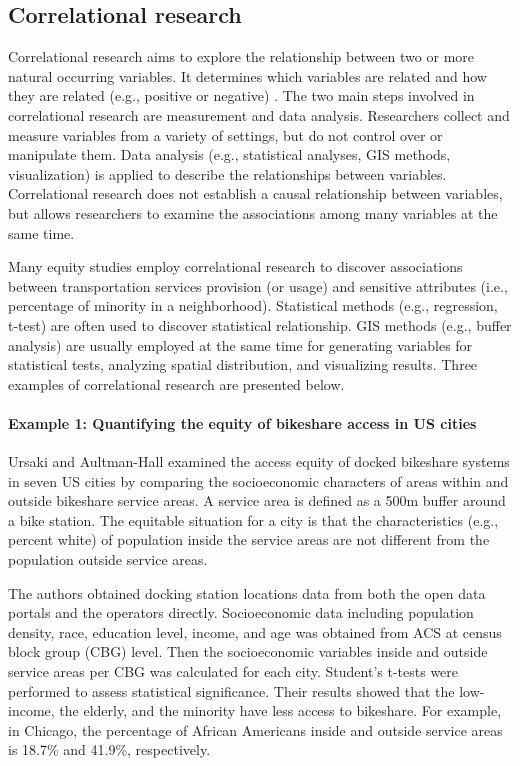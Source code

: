 \documentclass[11pt]{article}
\begin{document}
\subsection{Correlational research} \label{sec:correlation}
Correlational research aims to explore the relationship between two or more natural occurring variables. It determines which variables are related and how they are related (e.g., positive or negative) \cite{lazar2017research}. The two main steps involved in correlational research are measurement and data analysis. Researchers collect and measure variables from a variety of settings, but do not control over or manipulate them. Data analysis (e.g., statistical analyses, GIS methods, visualization) is applied to describe the relationships between variables. Correlational research does not establish a causal relationship between variables, but allows researchers to examine the associations among many variables at the same time.  

Many equity studies employ correlational research to discover associations between transportation services provision (or usage) and sensitive attributes (i.e., percentage of minority in a neighborhood). Statistical methods (e.g., regression, t-test) are often used to discover statistical relationship. GIS methods (e.g., buffer analysis) are usually employed at the same time for generating variables for statistical tests, analyzing spatial distribution, and visualizing results. Three examples of correlational research are presented below. 

\paragraph{Example 1: Quantifying the equity of bikeshare access in US cities}
Ursaki and Aultman-Hall \cite{ursaki2015quantifying} examined the access equity of docked bikeshare systems in seven US cities by comparing the socioeconomic characters of areas within and outside bikeshare service areas. A service area is defined as a 500m buffer around a bike station. The equitable situation for a city is that the characteristics (e.g., percent white) of population inside the service areas are not different from the population outside service areas. 

The authors obtained docking station locations data from both the open data portals and the operators directly. Socioeconomic data including population density, race, education level, income, and age was obtained from ACS at census block group (CBG) level. Then the socioeconomic variables inside and outside service areas per CBG was calculated for each city. Student’s t-tests were performed to assess statistical significance. Their results showed that the low-income, the elderly, and the minority have less access to bikeshare. For example, in Chicago, the percentage of African Americans inside and outside service areas is 18.7\% and 41.9\%, respectively. 
\end{document}
